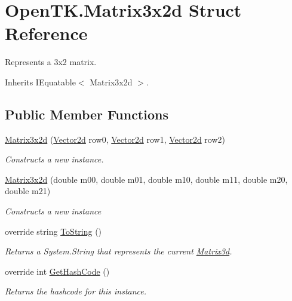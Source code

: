 \hypertarget{struct_open_t_k_1_1_matrix3x2d}{\section{Open\-T\-K.\-Matrix3x2d Struct Reference}
\label{struct_open_t_k_1_1_matrix3x2d}
}


Represents a 3x2 matrix.  




Inherits I\-Equatable$<$ Matrix3x2d $>$.

\subsection*{Public Member Functions}
\begin{DoxyCompactItemize}
\item 
\hyperlink{struct_open_t_k_1_1_matrix3x2d_a0682d78f95096402537b085113d03208}{Matrix3x2d} (\hyperlink{struct_open_t_k_1_1_vector2d}{Vector2d} row0, \hyperlink{struct_open_t_k_1_1_vector2d}{Vector2d} row1, \hyperlink{struct_open_t_k_1_1_vector2d}{Vector2d} row2)
\begin{DoxyCompactList}\small\item\em Constructs a new instance. \end{DoxyCompactList}\item 
\hyperlink{struct_open_t_k_1_1_matrix3x2d_a56e8efddb128cb7a8cbbe844b89d47e1}{Matrix3x2d} (double m00, double m01, double m10, double m11, double m20, double m21)
\begin{DoxyCompactList}\small\item\em Constructs a new instance \end{DoxyCompactList}\item 
override string \hyperlink{struct_open_t_k_1_1_matrix3x2d_a7e5876ec095d5f9ba7fc8ab741a3bc4f}{To\-String} ()
\begin{DoxyCompactList}\small\item\em Returns a System.\-String that represents the current \hyperlink{struct_open_t_k_1_1_matrix3d}{Matrix3d}. \end{DoxyCompactList}\item 
override int \hyperlink{struct_open_t_k_1_1_matrix3x2d_a631bd80ff04065b32bead8c09b41ea11}{Get\-Hash\-Code} ()
\begin{DoxyCompactList}\small\item\em Returns the hashcode for this instance. \end{DoxyCompactList}\item 

\end{DoxyCompactItemize}
